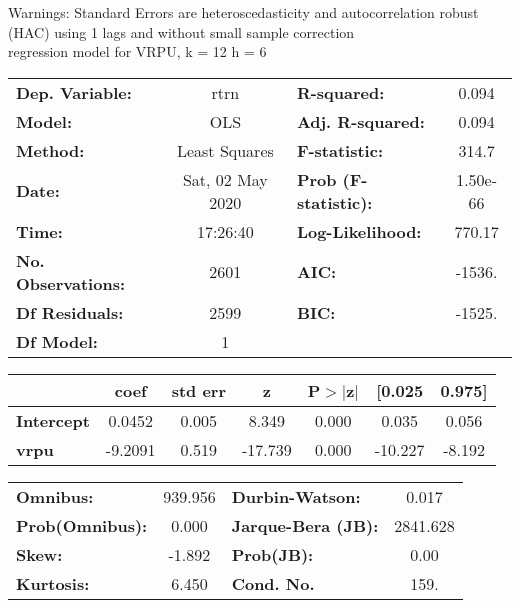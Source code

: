 Warnings: \newline
 [1] Standard Errors are heteroscedasticity and autocorrelation robust (HAC) using 1 lags and without small sample correction\\ 

regression model for VRPU, k = 12 h = 6\begin{center}
\begin{tabular}{lclc}
\toprule
\textbf{Dep. Variable:}    &       rtrn       & \textbf{  R-squared:         } &     0.094   \\
\textbf{Model:}            &       OLS        & \textbf{  Adj. R-squared:    } &     0.094   \\
\textbf{Method:}           &  Least Squares   & \textbf{  F-statistic:       } &     314.7   \\
\textbf{Date:}             & Sat, 02 May 2020 & \textbf{  Prob (F-statistic):} &  1.50e-66   \\
\textbf{Time:}             &     17:26:40     & \textbf{  Log-Likelihood:    } &    770.17   \\
\textbf{No. Observations:} &        2601      & \textbf{  AIC:               } &    -1536.   \\
\textbf{Df Residuals:}     &        2599      & \textbf{  BIC:               } &    -1525.   \\
\textbf{Df Model:}         &           1      & \textbf{                     } &             \\
\bottomrule
\end{tabular}
\begin{tabular}{lcccccc}
                   & \textbf{coef} & \textbf{std err} & \textbf{z} & \textbf{P$> |$z$|$} & \textbf{[0.025} & \textbf{0.975]}  \\
\midrule
\textbf{Intercept} &       0.0452  &        0.005     &     8.349  &         0.000        &        0.035    &        0.056     \\
\textbf{vrpu}      &      -9.2091  &        0.519     &   -17.739  &         0.000        &      -10.227    &       -8.192     \\
\bottomrule
\end{tabular}
\begin{tabular}{lclc}
\textbf{Omnibus:}       & 939.956 & \textbf{  Durbin-Watson:     } &    0.017  \\
\textbf{Prob(Omnibus):} &   0.000 & \textbf{  Jarque-Bera (JB):  } & 2841.628  \\
\textbf{Skew:}          &  -1.892 & \textbf{  Prob(JB):          } &     0.00  \\
\textbf{Kurtosis:}      &   6.450 & \textbf{  Cond. No.          } &     159.  \\
\bottomrule
\end{tabular}
\end{center}

